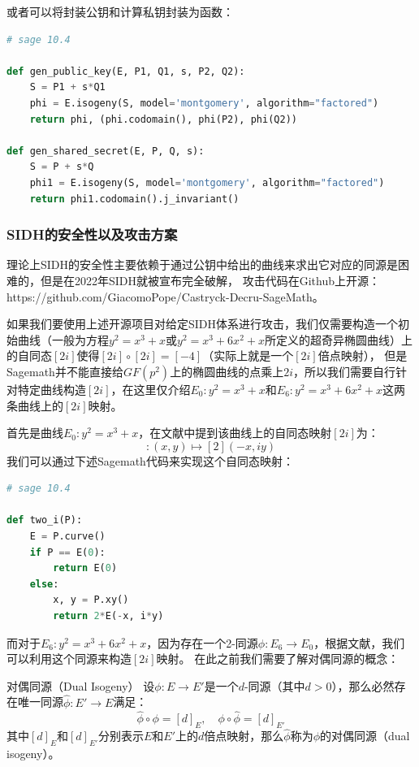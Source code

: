 \documentclass{book}
\numberwithin{equation}{subsubsection}
\begin{document}
或者可以将封装公钥和计算私钥封装为函数：
\begin{lstlisting}[language=Python,basicstyle=\ttfamily,breaklines=true,keywordstyle=\bfseries\color{blue}]
# sage 10.4

def gen_public_key(E, P1, Q1, s, P2, Q2):
    S = P1 + s*Q1
    phi = E.isogeny(S, model='montgomery', algorithm="factored")
    return phi, (phi.codomain(), phi(P2), phi(Q2))

def gen_shared_secret(E, P, Q, s):
    S = P + s*Q
    phi1 = E.isogeny(S, model='montgomery', algorithm="factored")
    return phi1.codomain().j_invariant()
\end{lstlisting}

\subsubsection{SIDH的安全性以及攻击方案\cite{28}}
理论上SIDH的安全性主要依赖于通过公钥中给出的曲线来求出它对应的同源是困难的，但是在2022年SIDH就被宣布完全破解，
攻击代码在Github上开源：https://github.com/GiacomoPope/Castryck-Decru-SageMath。\par
如果我们要使用上述开源项目对给定SIDH体系进行攻击，我们仅需要构造一个初始曲线（一般为方程$y^2=x^3+x$或$y^2=x^3+6x^2+x$所定义的超奇异椭圆曲线）上的自同态$[2i]$使得$[2i]\circ[2i]=[-4]$（实际上就是一个$[2i]$倍点映射），
但是Sagemath并不能直接给$GF(p^2)$上的椭圆曲线的点乘上$2i$，所以我们需要自行针对特定曲线构造$[2i]$，在这里仅介绍$E_0:y^2=x^3+x$和$E_6:y^2=x^3+6x^2+x$这两条曲线上的$[2i]$映射。\par
首先是曲线$E_0:y^2=x^3+x$，在文献\cite{28}中提到该曲线上的自同态映射$[2i]$为：
\begin{equation}
    [2i]:(x,y)\mapsto[2](-x,iy)
    \nonumber
\end{equation}
我们可以通过下述Sagemath代码来实现这个自同态映射：
\begin{lstlisting}[language=Python,basicstyle=\ttfamily,breaklines=true,keywordstyle=\bfseries\color{blue}]
# sage 10.4

def two_i(P):
    E = P.curve()
    if P == E(0):
        return E(0)
    else:
        x, y = P.xy()
        return 2*E(-x, i*y)
\end{lstlisting}
而对于$E_6:y^2=x^3+6x^2+x$，因为存在一个2-同源$\phi:E_6\to E_0$，根据文献\cite{28}，我们可以利用这个同源来构造$[2i]$映射。
在此之前我们需要了解对偶同源的概念：
\begin{concept}{对偶同源（Dual Isogeny）}
    设$\phi:E\to E'$是一个$d$-同源（其中$d>0$），那么必然存在唯一同源$\hat{\phi}:E'\to E$满足：
    \begin{equation}
        \hat{\phi}\circ\phi=[d]_E,\quad\phi\circ\hat{\phi}=[d]_{E'}
        \nonumber
    \end{equation}
    其中$[d]_E$和$[d]_{E'}$分别表示$E$和$E'$上的$d$倍点映射，那么$\hat{\phi}$称为$\phi$的对偶同源（dual isogeny）。
\end{concept}
\end{document}
